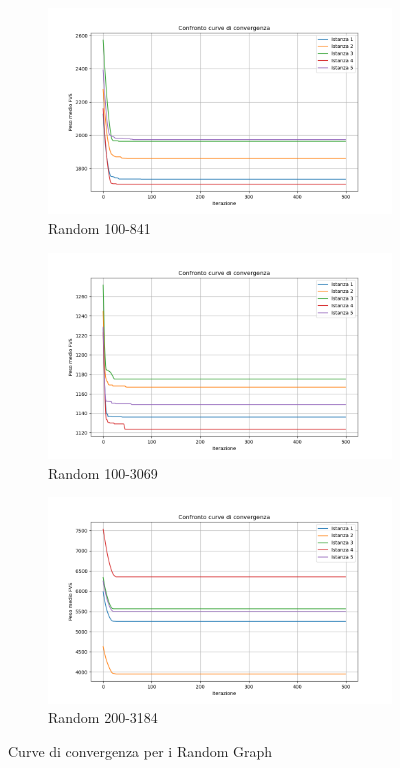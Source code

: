 \documentclass[a4paper, 10pt]{article}
\begin{document}
\begin{figure}[H]
\centering
\begin{subfigure}[t]{0.45\textwidth}
\centering
\includegraphics[width=\linewidth]{./img/rand_100_841.png}
\caption{Random 100-841}
\label{fig:rand1}
\end{subfigure}
\hfill
\begin{subfigure}[t]{0.45\textwidth}
\centering
\includegraphics[width=\linewidth]{./img/rand_100_3069.png}
\caption{Random 100-3069}
\label{fig:rand2}
\end{subfigure}
\hfill
\begin{subfigure}[t]{0.45\textwidth}
\centering
\includegraphics[width=\linewidth]{./img/rand_200_3184.png}
\caption{Random 200-3184}
\label{fig:rand3}
\end{subfigure}
\caption{Curve di convergenza per i Random Graph}
\label{fig:rand_grafici}
\end{figure}
\end{document}
